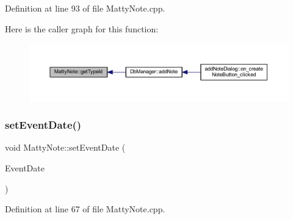 Definition at line 93 of file Matty\+Note.\+cpp.

Here is the caller graph for this function\+:
\nopagebreak
\begin{figure}[H]
\begin{center}
\leavevmode
\includegraphics[width=350pt]{classMattyNote_af5b90028a8e406e41b8c8a6de83685ef_icgraph}
\end{center}
\end{figure}
\hypertarget{classMattyNote_a70676b1ab215b873c9451a82cc417684}{}\label{classMattyNote_a70676b1ab215b873c9451a82cc417684} 
\subsubsection{\texorpdfstring{set\+Event\+Date()}{setEventDate()}}
{\footnotesize\ttfamily void Matty\+Note\+::set\+Event\+Date (\begin{DoxyParamCaption}\item[{const Q\+String \&}]{Event\+Date }\end{DoxyParamCaption})}



Definition at line 67 of file Matty\+Note.\+cpp.

